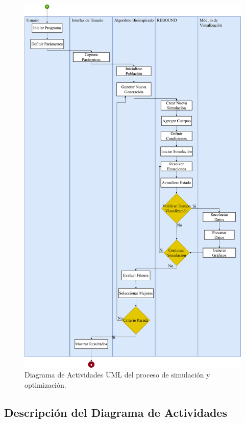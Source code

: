 \begin{figure}[H] %
    \centering
    \includegraphics[width=\textwidth]{img/Analisis/DiagramaActividades2.png}
    \caption{Diagrama de Actividades UML del proceso de simulación y optimización.}%
    \label{fig:activity_diagram} %
\end{figure}

\subsection{Descripción del Diagrama de Actividades}

